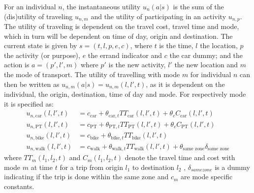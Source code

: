 For an individual $n$, the instantaneous utility $u_n(a|s)$ is the sum of the (dis)utility of traveling $u_{n,m}$ and the utility of participating in an activity $u_{n,p}$. The utility of traveling is dependent on the travel cost, travel time and mode, which in turn will be dependent on time of day, origin and destination. The current state is given by $s = (t,l,p,e,c)$, where $t$ is the time, $l$ the location, $p$ the activity (or purpose), $e$ the errand indicator and $c$ the car dummy; and the action is $a=(p',l',m)$ where $p'$ is the new activity, $l'$ the new location and $m$ the mode of transport. The utility of travelling with mode $m$ for individual $n$ can then be written as $u_{n,m}(a|s) = u_{n,m}(l,l',t)$, as it is dependent on the individual, the origin, destination, time of day and mode. For respectively mode it is specified as:
\newcommand{\car}{\text{car}}
\newcommand{\pt}{\text{PT}}
\newcommand{\walk}{\text{walk}}
\newcommand{\bike}{\text{bike}}
\newcommand{\dummy}[1]{\delta_{#1}}
\newcommand{\hi}{\text{h.i}}
\newcommand{\wait}{\text{wait}}
\newcommand{\geqfive}{\text{same zone}}
\newcommand{\mc}{c}
\newcommand{\ac}{c}
\newcommand{\dura}[1]{\Delta t_#1}
\newcommand{\TT}{TT}
\begin{align*}
u_{n,\car}(l,l',t) &= \mc_\car + \theta_{\car,t} \TT_\car(l,l',t) + \theta_{c} C_\car(l,l',t) \\
u_{n,\pt}(l,l',t) &= \mc_\pt + \theta_{\pt,t} \TT_\pt(l,l',t) + \theta_{c}  C_\pt(l,l',t) \\
u_{n,\bike}(l,l',t) &= \mc_\bike + \theta_{\bike,t} \TT_\bike(l,l',t) \\
u_{n,\walk}(l,l',t) &= \mc_\walk + \theta_{\walk,t} \TT_\walk(l,l',t) + \theta_{\geqfive} \dummy{\geqfive}
\end{align*}
where $\TT_m(l_1,l_2,t)$ and $C_m(l_1,l_2,t)$ denote the travel time and cost with mode $m$ at time $t$ for a trip from origin $l_1$ to destination $l_2$ , $\dummy{same zone}$ is a dummy indicating if the trip is done within the same zone and $\mc_m$ are mode specific constants.


